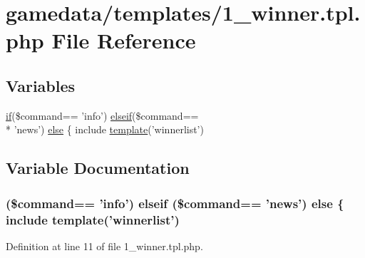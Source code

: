 \hypertarget{1__winner_8tpl_8php}{\section{gamedata/templates/1\+\_\+winner.tpl.\+php File Reference}
\label{1__winner_8tpl_8php}
}
\subsection*{Variables}
\begin{DoxyCompactItemize}
\item 
\hyperlink{login__old_8php_a4ac1118c2e44c513a674bc1793ba6c90}{if}(\$command== 'info') \hyperlink{urlist_8php_a77f52b43f81ed05a41b68c2161789055}{elseif}(\$command== \\*
'news') \hyperlink{1__winner_8tpl_8php_a0c11361c1df29bd8f15924caa2914665}{else} \{ include \hyperlink{global_8func_8php_a771b4d6b781f2a19234e18314036fe79}{template}('winnerlist')
\end{DoxyCompactItemize}


\subsection{Variable Documentation}
\hypertarget{1__winner_8tpl_8php_a0c11361c1df29bd8f15924caa2914665}{
\subsubsection[{else}]{ (\$command== 'info') {\bf elseif} (\$command== 'news') else \{ include {\bf template}('winnerlist')}}\label{1__winner_8tpl_8php_a0c11361c1df29bd8f15924caa2914665}


Definition at line 11 of file 1\+\_\+winner.\+tpl.\+php.

